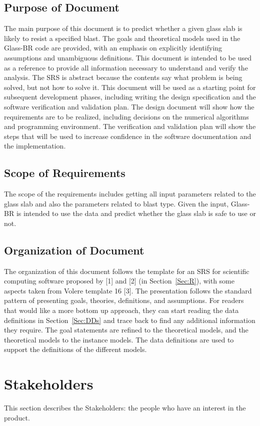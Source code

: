 \documentclass[12pt]{article}
\begin{document}
\subsection{Purpose of Document}
\label{Sec:PoD}
The main purpose of this document is to predict whether a given glass slab is likely to resist a specified blast. The goals and theoretical models used in the Glass-BR code are provided, with an emphasis on explicitly identifying assumptions and unambiguous definitions. This document is intended to be used as a reference to provide all information necessary to understand and verify the analysis. The SRS is abstract because the contents say what problem is being solved, but not how to solve it.
This document will be used as a starting point for subsequent development phases, including writing the design specification and the software verification and validation plan. The design document will show how the requirements are to be realized, including decisions on the numerical algorithms and programming environment. The verification and validation plan will show the steps that will be used to increase confidence in the software documentation and the implementation.
\subsection{Scope of Requirements}
\label{Sec:SoRs}
The scope of the requirements includes getting all input parameters related to the glass slab and also the parameters related to blast type. Given the input, Glass-BR is intended to use the data and predict whether the glass slab is safe to use or not.
\subsection{Organization of Document}
\label{Sec:OoD}
The organization of this document follows the template for an SRS for scientific computing software proposed by [1] and [2] (in Section~\ref{Sec:R}), with some aspects taken from Volere template 16 [3]. The presentation follows the standard pattern of presenting goals, theories, definitions, and assumptions. For readers that would like a more bottom up approach, they can start reading the data definitions in Section~\ref{Sec:DDs} and trace back to find any additional information they require.
The goal statements are refined to the theoretical models, and the theoretical models to the instance models. The data definitions are used to support the definitions of the different models.
\section{Stakeholders}
\label{Sec:S}
This section describes the Stakeholders: the people who have an interest in the product.
\end{document}

